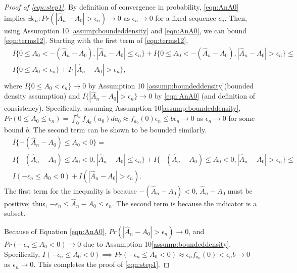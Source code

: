 {\begin{proof}[Proof of \cref{eqn:step1}]
By definition of convergence in probability, \cref{eqn:AnA0} implies $\exists\epsilon_n: Pr(|\widehat{A}_n - A_0|>\epsilon_n) \rightarrow 0 \text{ as } \epsilon_n \rightarrow 0$ for a fixed sequence $\epsilon_n$. Then, using Assumption \ifnum{} 10 \else \ref{assump:boundeddensity} \fi and \cref{eqn:AnA0}, we can bound \cref{eqn:terms12}. Starting with the first term of \cref{eqn:terms12},
\begin{equation*}
\label{eqn:term1}
\begin{split}
&I\{ 0 \le A_0 < -(\widehat{A}_n - A_0), |\widehat{A}_n-A_0|\le \epsilon_n \}  + I\{ 0 \le A_0 < -(\widehat{A}_n - A_0), |\widehat{A}_n-A_0| > \epsilon_n \} \le \\&I\{ 0 \le A_0 < \epsilon_n\} + I \{ |\widehat{A}_n - A_0| > \epsilon_n \}, \\    
\end{split}
\end{equation*}
 where $I\{ 0 \le A_0 < \epsilon_n\} \rightarrow 0$ by Assumption \ifnum{} 10 \else \ref{assump:boundeddensity}\fi (bounded density assumption) and
$I \{ |\widehat{A}_n - A_0| > \epsilon_n \} \rightarrow 0$ by \cref{eqn:AnA0} (and definition of consistency). Specifically, assuming Assumption \ifnum{} 10\else \ref{assump:boundeddensity}\fi,
$Pr(0\le A_0 \le \epsilon_n) = \int^{\epsilon_n}_{0} f_{A_0}(a_0)da_0 \approx f_{a_0}(0)\epsilon_n \le b\epsilon_n \rightarrow 0 $ as $\epsilon_n \rightarrow 0 $ for some bound $b$. The second term can be shown to be bounded similarly. 
\begin{equation*}
\begin{split}
&I \{- (\widehat{A}_n - A_0) \le A_0 < 0 \} = \\
&I \{- (\widehat{A}_n - A_0) \le A_0 < 0 , |\widehat{A}_n - A_0| \le \epsilon_n\} +
I \{- (\widehat{A}_n - A_0) \le A_0 < 0 , |\widehat{A}_n - A_0| > \epsilon_n\} \leq\\
&I(-\epsilon_n \leq A_0 < 0) + I(|\widehat{A}_n - A_0| > \epsilon_n).
\end{split}
\end{equation*} The first term for the inequality is because $-(\widehat{A}_n - A_0) < 0$, $\widehat{A}_n - A_0$ must be positive; thus, $-\epsilon_n \leq \widehat{A}_n - A_0 \leq \epsilon_n$.  The second term is because the indicator is a subset.

Because of Equation \cref{eqn:AnA0}, $Pr(|\widehat{A}_n - A_0| > \epsilon_n) \rightarrow 0$, and $Pr(-\epsilon_n \leq A_0 < 0) \rightarrow 0$ due to Assumption \ifnum{} 10\else \ref{assump:boundeddensity}\fi.
Specifically, $I(-\epsilon_n \leq A_0 < 0)  \implies Pr(-\epsilon_n \le A_0 < 0) \approx \epsilon_n f_{a_0}(0) < \epsilon_n b \rightarrow 0$ as $\epsilon_n \rightarrow 0$.
This completes the proof of \cref{eqn:step1}.
\end{proof}
}

